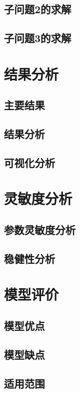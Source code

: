 \documentclass{cumcmthesis}
\begin{document}
\subsection{子问题2的求解}
\subsection{子问题3的求解}

\section{结果分析}
\subsection{主要结果}
\subsection{结果分析}
\subsection{可视化分析}

\section{灵敏度分析}
\subsection{参数灵敏度分析}
\subsection{稳健性分析}

\section{模型评价}
\subsection{模型优点}
\subsection{模型缺点}
\subsection{适用范围}

\end{document}
